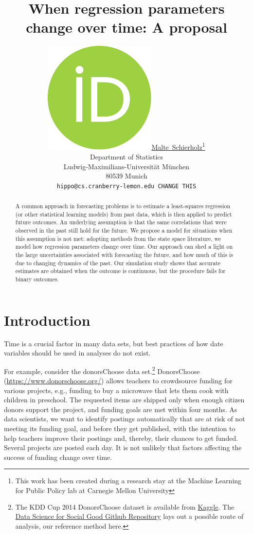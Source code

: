 \documentclass{article}
\title{When regression parameters change over time: A proposal}
\author{ \href{https://orcid.org/0000-0003-4058-1543}{\includegraphics[scale=0.06]{orcid.pdf}\hspace{1mm}Malte~Schierholz}\thanks{This work has been created during a research stay at the Machine Learning for Public Policy lab at Carnegie Mellon University} \\
	Department of Statistics\\
	Ludwig-Maximilians-Universität München\\
	80539 Munich \\
	\texttt{hippo@cs.cranberry-lemon.edu CHANGE THIS} \\
}
\begin{document}
\maketitle

\begin{abstract}
	A common approach in forecasting problems is to estimate a least-squares regression (or other statistical learning models) from past data, which is then applied to predict future outcomes. An underlying assumption is that the same correlations that were observed in the past still hold for the future. We propose a model for situations when this assumption is not met: adopting methods from the state space literature, we model how regression parameters change over time. Our approach can shed a light on the large uncertainties associated with forecasting the future, and how much of this is due to changing dynamics of the past. Our simulation study shows that accurate estimates are obtained when the outcome is continuous, but the procedure fails for binary outcomes.
\end{abstract}




\section{Introduction}\label{sec:introduction}

Time is a crucial factor in many data sets, but best practices of how date variables should be used in analyses do not exist.

For example, consider the donorsChoose data set.\footnote{The KDD Cup 2014 DonorsChoose dataset is available from \href{https://www.kaggle.com/c/kdd-cup-2014-predicting-excitement-at-donors-choose/data}{Kaggle}. The \href{https://github.com/dssg/donors-choose}{Data Science for Social Good Github Repository} lays out a possible route of analysis, our reference method here.} DonorsChoose (\url{https://www.donorschoose.org/}) allows teachers to crowdsource funding for various projects, e.g., funding to buy a microwave that lets them cook with children in preschool. The requested items are shipped only when enough citizen donors support the project, and funding goals are met within four months. As data scientists, we want to identify postings automatically that are at risk of not meeting its funding goal, and before they get published, with the intention to help teachers improve their postings and, thereby, their chances to get funded. Several projects are posted each day. It is not unlikely that factors affecting the success of funding change over time.
\end{document}
